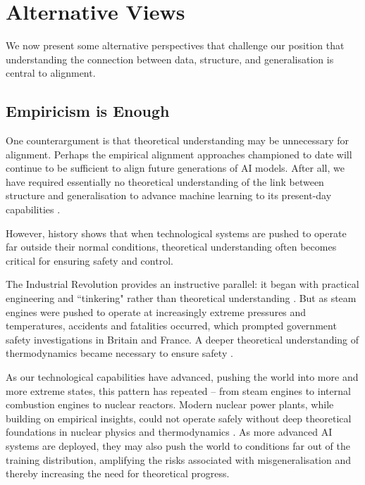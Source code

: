 \section{Alternative Views}\label{section:alt}
We now present some alternative perspectives that challenge our position that understanding the connection between data, structure, and generalisation is central to alignment.

\subsection{Empiricism is Enough}
One counterargument is that theoretical understanding may be unnecessary for alignment. Perhaps the empirical alignment approaches championed to date \citep{askell2021general,bai2022constitutional,ouyang2022training} will continue to be sufficient to align future generations of AI models. After all, we have required essentially no theoretical understanding of the link between structure and generalisation to advance machine learning to its present-day capabilities \citep{sutton2019bitter}.

However, history shows that when technological systems are pushed to operate far outside their normal conditions, theoretical understanding often becomes critical for ensuring safety and control. 

The Industrial Revolution provides an instructive parallel: it began with practical engineering and ``tinkering" rather than theoretical understanding \citep{cardwell1971, mokyr1992lever}. But as steam engines were pushed to operate at increasingly extreme pressures and temperatures, accidents and fatalities occurred, which prompted government safety investigations in Britain and France. A deeper theoretical understanding of thermodynamics became necessary to ensure safety \citep[pp.177--180]{cardwell1971}. %

As our technological capabilities have advanced, pushing the world into more and more extreme states, this pattern has repeated -- from steam engines to internal combustion engines to nuclear reactors. Modern nuclear power plants, while building on empirical insights, could not operate safely without deep theoretical foundations in nuclear physics and thermodynamics \citep{zohuri2015thermodynamics}. As more advanced AI systems are deployed, they may also push the world to conditions far out of the training distribution, amplifying the risks associated with misgeneralisation and thereby increasing the need for theoretical progress.

